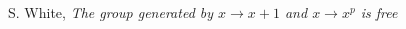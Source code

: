 \begin{thebibliography}{99}

  S. White,
  \textit{The group generated by $x \rightarrow x + 1$ and $x \rightarrow x^p$
  is free}
\end{thebibliography}
